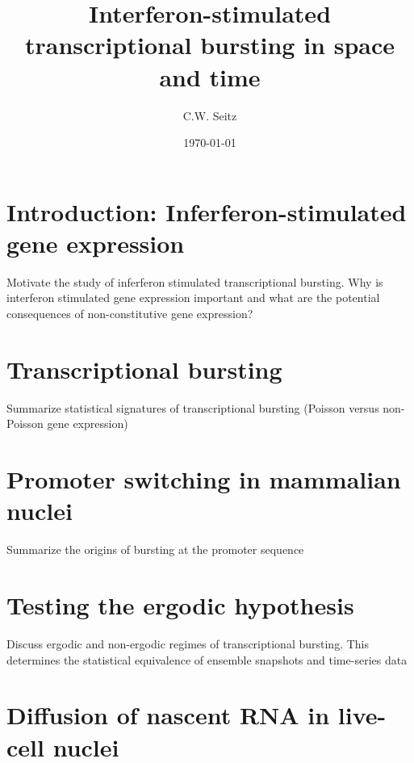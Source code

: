 \documentclass{article}
\title{Interferon-stimulated transcriptional bursting in space and time}
\author{C.W. Seitz}
\date{\today}
\begin{document}
\maketitle

\section{Introduction: Inferferon-stimulated gene expression}

Motivate the study of inferferon stimulated transcriptional bursting. Why is interferon stimulated gene expression important and what are the potential consequences of non-constitutive gene expression? 

\section{Transcriptional bursting}

Summarize statistical signatures of transcriptional bursting (Poisson versus non-Poisson gene expression)

\section{Promoter switching in mammalian nuclei}

Summarize the origins of bursting at the promoter sequence

\section{Testing the ergodic hypothesis}

Discuss ergodic and non-ergodic regimes of transcriptional bursting. This determines the statistical equivalence of ensemble snapshots and time-series data

\section{Diffusion of nascent RNA in live-cell nuclei}
\end{document}
